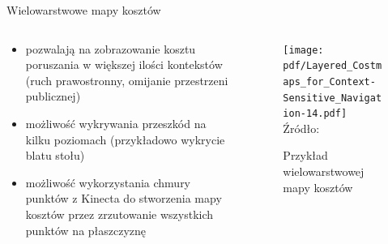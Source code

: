 \begin{frame}
{Wielowarstwowe mapy kosztów}
\begin{columns}
		\begin{column}{0.5\textwidth}
			\begin{itemize}
				\item pozwalają na zobrazowanie kosztu poruszania w większej ilości kontekstów (ruch prawostronny, omijanie przestrzeni publicznej)
				\item możliwość wykrywania przeszkód na kilku poziomach (przykładowo wykrycie blatu stołu)
				\item możliwość wykorzystania chmury punktów z Kinecta do stworzenia mapy kosztów przez zrzutowanie wszystkich punktów na płaszczyznę
			\end{itemize}
		\end{column}
		\begin{column}{0.5\textwidth}  %
			\begin{figure}
				\begin{center}
					\texttt{[image: pdf/Layered\_Costmaps\_for\_Context-Sensitive\_Navigation-14.pdf]}
					\hspace*{5pt}\hbox{\scriptsize{Źródło:}}
					\caption{Przykład wielowarstwowej mapy kosztów }
				\end{center}
			\end{figure}
		\end{column}
	\end{columns}
\end{frame}

